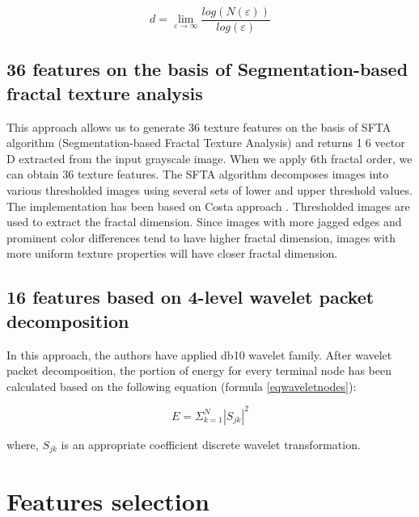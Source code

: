 \documentclass[review,12pt]{elsarticle}
\begin{document}
\begin{equation}
d=\lim_{\varepsilon\rightarrow\infty}\frac{log(N(\varepsilon))}{log(\varepsilon)}
\label{eqboxcounting}
\end{equation}

\subsection{36 features on the basis of Segmentation-based fractal texture analysis}

This approach allows us to generate 36 texture features on the basis of SFTA	algorithm (Segmentation-based Fractal Texture Analysis) and returns 16 vector D extracted from the input grayscale image. When we apply 6th fractal order, we can obtain 36 texture features.
The SFTA algorithm decomposes images into various thresholded images using several sets of lower and upper threshold values. The implementation has been based on Costa approach \citep{Costa2012}. Thresholded images are used to extract the fractal dimension. Since images with more jagged edges and prominent color differences tend to have higher fractal dimension, images with more uniform texture properties will have closer fractal dimension.

\subsection{16 features based on 4-level wavelet packet decomposition}

In this approach, the authors have applied db10 wavelet family. After wavelet packet decomposition, the portion of energy for every terminal node has been calculated based on the following equation (formula \ref{eqwaveletnodes}):

\begin{equation}
E=\Sigma_{k=1}^{N}|S_{jk}|^{2}
\label{eqwaveletnodes}
\end{equation}

where, $S_{jk}$ is an appropriate coefficient discrete wavelet transformation.

\section{Features selection}
\end{document}
